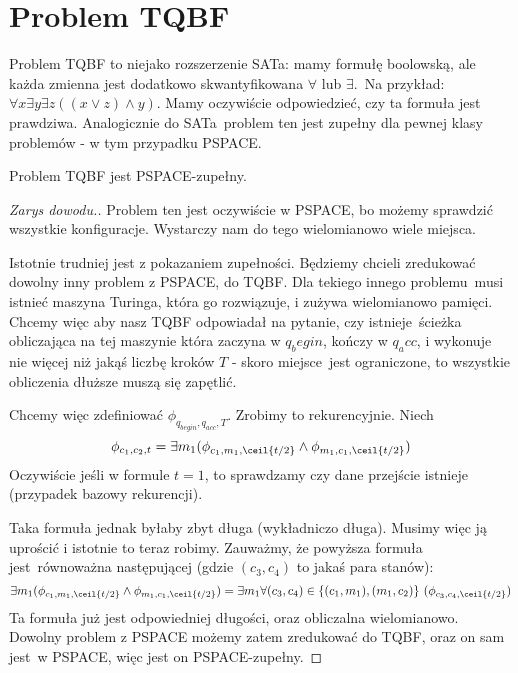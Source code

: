\section{Problem TQBF}

Problem TQBF to niejako rozszerzenie SATa: mamy formułę boolowską, ale każda zmienna jest dodatkowo skwantyfikowana \(\forall\) lub \(\exists\).\
Na przykład: \(\forall x \exists y \exists z ((x \vee z) \wedge y)\). Mamy oczywiście odpowiedzieć, czy ta formuła jest prawdziwa. Analogicznie do SATa\
problem ten jest zupełny dla pewnej klasy problemów - w tym przypadku PSPACE.

\begin{theorem}
    Problem TQBF jest PSPACE-zupełny.
\end{theorem}

\begin{proof}[Zarys dowodu.]
    Problem ten jest oczywiście w PSPACE, bo możemy sprawdzić wszystkie konfiguracje. Wystarczy nam do tego wielomianowo wiele miejsca.

    Istotnie trudniej jest z pokazaniem zupełności. Będziemy chcieli zredukować dowolny inny problem z PSPACE, do TQBF. Dla tekiego innego problemu\
    musi istnieć maszyna Turinga, która go rozwiązuje, i zużywa wielomianowo pamięci. Chcemy więc aby nasz TQBF odpowiadał na pytanie, czy istnieje\
    ścieżka obliczająca na tej maszynie która zaczyna w \(q_begin\), kończy w \(q_acc\), i wykonuje nie więcej niż jakąś liczbę kroków \(T\) - skoro miejsce\
    jest ograniczone, to wszystkie obliczenia dłuższe muszą się zapętlić.

    Chcemy więc zdefiniować \(\phi_{q_{begin},q_{acc},T}\). Zrobimy to rekurencyjnie. Niech 
    \[
        \phi_{c_1,c_2,t} = \exists m_1 (\phi_{c_1, m_1, \ceil{t/2}} \wedge \phi_{m_1, c_1, \ceil{t/2}})
    \]
    Oczywiście jeśli w formule \(t=1\), to sprawdzamy czy dane przejście istnieje (przypadek bazowy rekurencji). 

    Taka formuła jednak byłaby zbyt długa (wykładniczo długa). Musimy więc ją uprościć i istotnie to teraz robimy. Zauważmy, że powyższa formuła jest\
    równoważna następującej (gdzie \((c_3, c_4)\) to jakaś para stanów):
    \[
        \exists m_1 (\phi_{c_1, m_1, \ceil{t/2}} \wedge \phi_{m_1, c_1, \ceil{t/2}}) = \exists m_1 \forall(c_3, c_4) \in \{(c_1,m_1),(m_1,c_2)\}\
        (\phi_{c_3,c_4,\ceil{t/2}})
    \]
    Ta formuła już jest odpowiedniej długości, oraz obliczalna wielomianowo. Dowolny problem z PSPACE możemy zatem zredukować do TQBF, oraz on sam jest\
    w PSPACE, więc jest on PSPACE-zupełny.
\end{proof}